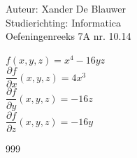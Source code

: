 \documentclass[a4paper]{article}
\begin{document}
\noindent \large Auteur: Xander De Blauwer \\
\noindent \large Studierichting: Informatica\\
\noindent \large Oefeningenreeks 7A nr. 10.14\\

\medskip

\normalsize

$f(x,y,z) = x^4 - 16yz$ \\

$\dfrac{\partial f}{\partial x}(x,y,z) = 4x^3$ \\

$\dfrac{\partial f}{\partial y}(x,y,z) = -16z$ \\

$\dfrac{\partial f}{\partial z}(x,y,z) = -16y$ \\



\begin{thebibliography}{999}
\end{thebibliography}
\end{document}
